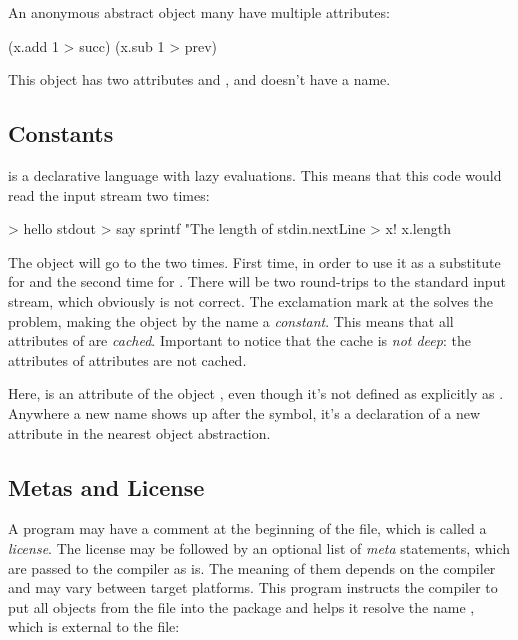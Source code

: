 An anonymous abstract object many have multiple attributes:

\begin{ffcode}
[x] (x.add 1 > succ) (x.sub 1 > prev)
\end{ffcode}

This object has two attributes  and , and doesn't
have a name.

\subsection{Constants}

\eo{} is a declarative language with lazy evaluations. This means
that this code would read the input stream two times:

\begin{ffcode}
[] > hello
  stdout > say
    sprintf
      "The length of %
      stdin.nextLine > x!
      x.length
\end{ffcode}

The  object will go to the  two times. First time,
in order to use it as a substitute for  and the second time for
. There will be two round-trips to the standard input stream, which
obviously is not correct. The exclamation mark at the  solves the
problem, making the object by the name  a \emph{constant}. This means
that all attributes of  are \emph{cached}. Important to notice
that the cache is \emph{not deep}: the attributes of attributes are not cached.

Here,  is an attribute of the object , even though
it's not defined as explicitly as . Anywhere a new
name shows up after the \ff{>} symbol, it's a declaration of a new
attribute in the nearest object abstraction.

\subsection{Metas and License}

A program may have a comment at the beginning of the file, which
is called a \emph{license}. The license may be followed by an optional
list of \emph{meta} statements, which are passed to the compiler
as is. The meaning of them depends on the compiler and may vary
between target platforms. This program instructs the compiler
to put all objects from the file into the package 
and helps it resolve the name , which is external
to the file:

